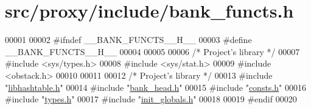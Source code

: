 \hypertarget{bank__functs_8h_source}{
\section{src/proxy/include/bank\_\-functs.h}
}

\begin{DoxyCode}
00001 
00002 \textcolor{preprocessor}{#ifndef \_\_BANK\_FUNCTS\_\_H\_\_}
00003 \textcolor{preprocessor}{}\textcolor{preprocessor}{#define \_\_BANK\_FUNCTS\_\_H\_\_}
00004 \textcolor{preprocessor}{}
00005 
00006         \textcolor{comment}{/*      Project's library       */}
00007 \textcolor{preprocessor}{#include        <sys/types.h>}
00008 \textcolor{preprocessor}{#include        <sys/stat.h>}
00009 \textcolor{preprocessor}{#include        <obstack.h>}
00010 
00011 
00012         \textcolor{comment}{/*      Project's library       */}
00013 \textcolor{preprocessor}{#include        "\hyperlink{proxy_2include_2libhashtable_8h}{libhashtable.h}"}
00014 \textcolor{preprocessor}{#include        "\hyperlink{bank__head_8h}{bank_head.h}"}
00015 \textcolor{preprocessor}{#include        "\hyperlink{proxy_2include_2consts_8h}{consts.h}"}
00016 \textcolor{preprocessor}{#include        "\hyperlink{types_8h}{types.h}"}
00017 \textcolor{preprocessor}{#include        "\hyperlink{init__globals_8h}{init_globals.h}"}
00018 
00019 \textcolor{preprocessor}{#endif}
00020 \textcolor{preprocessor}{}
\end{DoxyCode}
